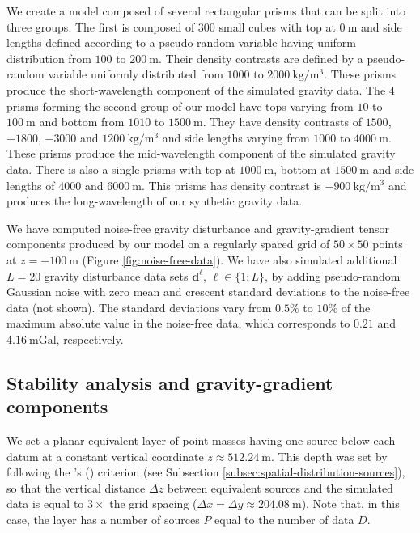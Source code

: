 We create a model composed of several rectangular prisms that can be split into three groups.
The first is composed of $300$ small cubes with top at $0 \: \mathrm{m}$ and side lengths
defined according to a pseudo-random variable having uniform distribution from 
$100$ to $200 \: \mathrm{m}$.
Their density contrasts are defined by a pseudo-random variable uniformly distributed
from $1000$ to $2000 \: \mathrm{kg / m^{3}}$.
These prisms produce the short-wavelength component of the simulated gravity data.
The $4$ prisms forming the second group of our model have tops varying from 
$10$ to $100 \: \mathrm{m}$ and bottom from $1010$ to $1500 \: \mathrm{m}$.
They have density contrasts of $1500$, $-1800$, $-3000$ and $1200  \: \mathrm{kg / m^{3}}$
and side lengths varying from $1000$ to $4000 \: \mathrm{m}$.
These prisms produce the mid-wavelength component of the simulated gravity data.
There is also a single prisms with top at $1000 \: \mathrm{m}$, bottom at 
$1500 \: \mathrm{m}$ and side lengths of $4000$ and $6000 \: \mathrm{m}$.
This prisms has density contrast is $-900 \: \mathrm{kg / m^{3}}$ and produces the
long-wavelength of our synthetic gravity data.

We have computed noise-free gravity disturbance and gravity-gradient tensor components 
produced by our model on a regularly spaced grid of $50 \times 50$ points at 
$z = -100 \: \mathrm{m}$ (Figure \ref{fig:noise-free-data}).
We have also simulated additional $L = 20$ gravity disturbance data sets $\mathbf{d}^{\ell}$, $\ell \in \{1:L\}$, 
by adding pseudo-random Gaussian noise with zero mean and crescent standard deviations to the noise-free data (not shown).
The standard deviations vary from $0.5\%$ to $10\%$ of the maximum absolute value in the noise-free data,
which corresponds to $0.21$ and $4.16 \: \mathrm{mGal}$, respectively.

\subsection{Stability analysis and gravity-gradient components}

We set a planar equivalent layer of point masses having one source below each datum at a constant vertical coordinate $z \approx 512.24 \: \mathrm{m}$.
This depth was set by following the \citeauthor{dampney1969}'s (\citeyear{dampney1969}) criterion (see Subsection \ref{subsec:spatial-distribution-sources}),
so that the vertical distance $\Delta z$ between equivalent sources and the simulated data is equal to $3 \times$ the grid spacing 
($\Delta x = \Delta y \approx 204.08 \: \mathrm{m} $).
Note that, in this case, the layer has a number of sources $P$ equal to the number of data $D$.

